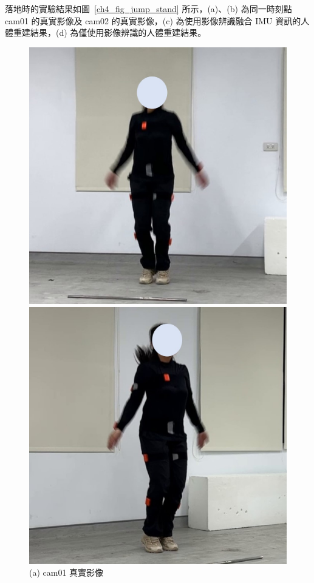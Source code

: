 \clearpage

落地時的實驗結果如圖~\ref{ch4_fig_jump_stand} 所示，(a)、(b) 為同一時刻點 cam01 的真實影像及 cam02 的真實影像，(c) 為使用影像辨識融合 IMU 資訊的人體重建結果，(d) 為僅使用影像辨識的人體重建結果。

\begin{figure}[!ht]
   \centering
   \begin{minipage}{.5\textwidth}
      \centering
      \includegraphics[width=.95\linewidth]{figure/ch4_fig_jump_cam01_with2.jpg}
      \caption*{(a) cam01 真實影像}
    \end{minipage}%
    \begin{minipage}{.5\textwidth}
       \centering
       \includegraphics[width=.95\linewidth]{figure/ch4_fig_jump_cam02_with2.jpg}

\end{minipage}
\end{figure}
